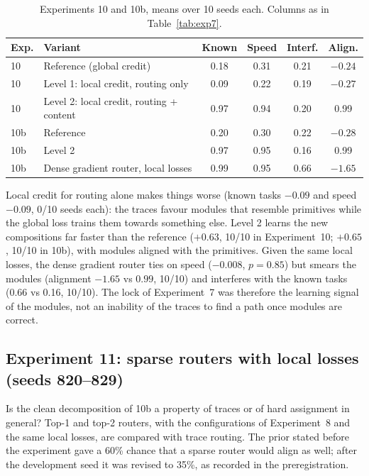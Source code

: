 \documentclass[11pt,a4paper]{article}
\begin{document}
\begin{table}[h]
\centering\small\setlength{\tabcolsep}{5pt}
\begin{tabular}{llcccc}
\toprule
Exp. & Variant & Known & Speed & Interf. & Align. \\
\midrule
10 & Reference (global credit) & 0.18 & 0.31 & 0.21 & $-0.24$ \\
10 & Level 1: local credit, routing only & 0.09 & 0.22 & 0.19 & $-0.27$ \\
10 & Level 2: local credit, routing + content & 0.97 & 0.94 & 0.20 & 0.99 \\
10b & Reference & 0.20 & 0.30 & 0.22 & $-0.28$ \\
10b & Level 2 & 0.97 & 0.95 & 0.16 & 0.99 \\
10b & Dense gradient router, local losses & 0.99 & 0.95 & 0.66 & $-1.65$ \\
\bottomrule
\end{tabular}
\caption{Experiments 10 and 10b, means over 10 seeds each. Columns as in Table~\ref{tab:exp7}.}
\label{tab:exp10}
\end{table}

Local credit for routing alone makes things worse (known tasks $-0.09$ and speed $-0.09$, 0/10 seeds each): the traces favour modules that resemble primitives while the global loss trains them towards something else. Level 2 learns the new compositions far faster than the reference ($+0.63$, 10/10 in Experiment~10; $+0.65$, 10/10 in 10b), with modules aligned with the primitives. Given the same local losses, the dense gradient router ties on speed ($-0.008$, $p = 0.85$) but smears the modules (alignment $-1.65$ vs $0.99$, 10/10) and interferes with the known tasks (0.66 vs 0.16, 10/10). The lock of Experiment~7 was therefore the learning signal of the modules, not an inability of the traces to find a path once modules are correct.

\subsection{Experiment 11: sparse routers with local losses (seeds 820--829)}

Is the clean decomposition of 10b a property of traces or of hard assignment in general? Top-1 and top-2 routers, with the configurations of Experiment~8 and the same local losses, are compared with trace routing. The prior stated before the experiment gave a 60\% chance that a sparse router would align as well; after the development seed it was revised to 35\%, as recorded in the preregistration.
\end{document}

